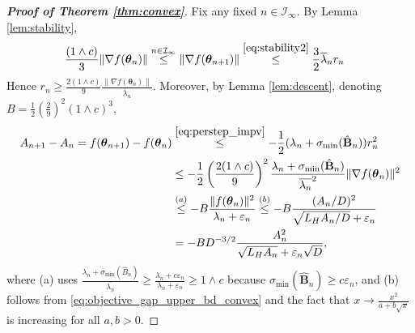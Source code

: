 \documentclass[11pt]{amsart}
\theoremstyle{plain}
\theoremstyle{definition}
\theoremstyle{remark}
\def\eps{\varepsilon}
\def\B{\mathbf{B}}
\def\param{\boldsymbol{\theta}}
\newcommand{\commHL}[1]{{\textcolor{blue}{#1}}}
\begin{document}
\begin{proof}[\textbf{Proof of Theorem \ref{thm:convex}}]
   Fix any fixed $n\in \mathcal{I}_{\infty}$. By Lemma \ref{lem:stability}, 
	\begin{align*}
		\frac{(1\wedge c)}{3} \|\nabla f(\param_{n})  \| \overset{n\in \mathcal{I}_{\infty}}{\le} \|\nabla f(\param_{n+1})  \|  &\overset{\eqref{eq:stability2}}{\le}  \frac{3}{2}\overline{\lambda}_n r_n
	\end{align*}
	Hence $r_{n} \ge \frac{2(1\wedge c)}{9} \frac{\| \nabla f(\param_{n}) \|}{\overline{\lambda}_n}$.
	Moreover, by Lemma \ref{lem:descent}, denoting $B=\frac{1}{2}\left(\frac{2}{9}\right)^2(1\wedge c)^3$, 
    \begin{align*}
			A_{n+1}-A_{n}=f(\param_{n+1}) - f(\param_{n}) 
            &\overset{\eqref{eq:perstep_impv}}{\le} 	-\frac{1}{2} (\lambda_{n}+\sigma_{\min}(\hat{\B}_n)) r_{n}^{2} \\
			&\le - \frac{1}{2} \left(\frac{2(1\wedge c)}{9}\right)^2 \frac{\lambda_{n}+\sigma_{\min}(\hat{\B}_n)}{\overline{\lambda_n}^2}\|\nabla f(\param_n)\|^2\\
            &\overset{(a)}{\le}  -B \frac{\|f(\param_n)\|^2}{\lambda_n+\eps_n} 
            \overset{(b)}{\leq} -B  \frac{(A_{n}/D)^{2}}
            {\sqrt{L_H A_{n}/D}+\eps_n}\\
            &=-BD^{-3/2}\frac{A_n^2}{\sqrt{L_HA_n}+\eps_n\sqrt{D}},
	\end{align*}    
      where (a) uses 
      $\frac{\lambda_n+\sigma_{\min}(\hat{B}_n)}{\overline{\lambda_n}}\geq\frac{\lambda_n+c\eps_n}{\lambda_n+\eps_n}\geq 1\wedge c$ because $\sigma_{\min}(\hat{\B}_n)\ge c\eps_{n}$,
      and (b) 
    follows from \eqref{eq:objective_gap_upper_bd_convex} and the fact that $x\to \frac{x^2}{a+b\sqrt{x}}$ is increasing for all $a,b>0$.
    

\end{proof}
\end{document}
